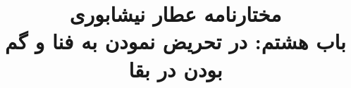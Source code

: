 \documentclass[14pt,b5paper]{article}
\begin{document}
\title{\Huge مختارنامه عطار نیشابوری \\
باب هشتم: در تحریض نمودن به فنا و گم بودن در بقا}
\author{ }
\date{ }
\maketitle
\newpage
\tableofcontents
\newpage

\newpage

\newpage

\newpage

\newpage

\newpage

\newpage

\newpage

\newpage

\newpage

\newpage

\newpage

\newpage

\newpage

\newpage

\newpage

\newpage

\newpage

\newpage

\newpage

\newpage

\newpage

\newpage

\newpage

\newpage

\newpage

\newpage

\newpage

\newpage

\newpage

\newpage

\newpage

\newpage

\newpage

\newpage

\newpage

\newpage

\newpage

\newpage

\newpage

\newpage

\newpage

\newpage

\newpage

\newpage

\newpage

\newpage

\newpage

\newpage

\newpage

\newpage

\newpage

\newpage

\newpage

\newpage

\newpage

\newpage

\newpage

\newpage

\newpage

\newpage

\newpage

\newpage

\newpage

\newpage

\newpage
\end{document}
